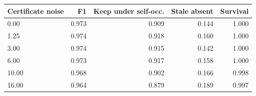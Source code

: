 \begin{tabular}{lrrrr}
\hline
Certificate noise & F1 & Keep under self-occ. & Stale absent & Survival \\
\hline
0.00 & 0.973 & 0.909 & 0.144 & 1.000 \\
1.25 & 0.974 & 0.918 & 0.160 & 1.000 \\
3.00 & 0.974 & 0.915 & 0.142 & 1.000 \\
6.00 & 0.973 & 0.917 & 0.158 & 1.000 \\
10.00 & 0.968 & 0.902 & 0.166 & 0.998 \\
16.00 & 0.964 & 0.879 & 0.189 & 0.997 \\
\hline
\end{tabular}
